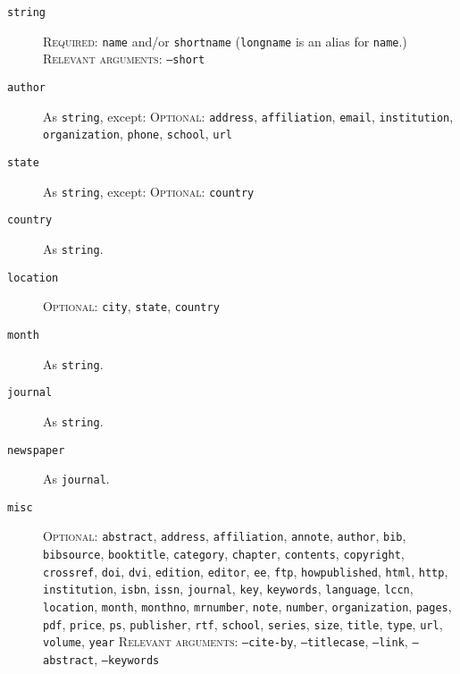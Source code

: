 \documentclass{article}
\begin{document}
\begin{description}

\item[\texttt{string}]
\textsc{Required:} \texttt{name} and/or \texttt{shortname}
(\texttt{longname} is an alias for \texttt{name}.)
\textsc{Relevant arguments:} \texttt{--short}

\item[\texttt{author}] As \texttt{string}, except:
\textsc{Optional:} \texttt{address}, \texttt{affiliation}, \texttt{email},
\texttt{institution}, \texttt{organization}, \texttt{phone},
\texttt{school}, \texttt{url}

\item[\texttt{state}] As \texttt{string}, except:
\textsc{Optional:} \texttt{country}

\item[\texttt{country}] As \texttt{string}.

\item[\texttt{location}]
\textsc{Optional:} \texttt{city}, \texttt{state}, \texttt{country}

\item[\texttt{month}] As \texttt{string}.

\item[\texttt{journal}] As \texttt{string}.

\item[\texttt{newspaper}] As \texttt{journal}.

\item[\texttt{misc}]
\textsc{Optional:}
\texttt{abstract},
\texttt{address},
\texttt{affiliation},
\texttt{annote},
\texttt{author},
\texttt{bib},
\texttt{bibsource},
\texttt{booktitle},
\texttt{category},
\texttt{chapter},
\texttt{contents},
\texttt{copyright},
\texttt{crossref},
\texttt{doi},
\texttt{dvi},
\texttt{edition},
\texttt{editor},
\texttt{ee},
\texttt{ftp},
\texttt{howpublished},
\texttt{html},
\texttt{http},
\texttt{institution},
\texttt{isbn},
\texttt{issn},
\texttt{journal},
\texttt{key},
\texttt{keywords},
\texttt{language},
\texttt{lccn},
\texttt{location},
\texttt{month},
\texttt{monthno},
\texttt{mrnumber},
\texttt{note},
\texttt{number},
\texttt{organization},
\texttt{pages},
\texttt{pdf},
\texttt{price},
\texttt{ps},
\texttt{publisher},
\texttt{rtf},
\texttt{school},
\texttt{series},
\texttt{size},
\texttt{title},
\texttt{type},
\texttt{url},
\texttt{volume},
\texttt{year}
\textsc{Relevant arguments:} \texttt{--cite-by}, \texttt{--titlecase},
\texttt{--link}, \texttt{--abstract}, \texttt{--keywords}


\end{description}
\end{document}
